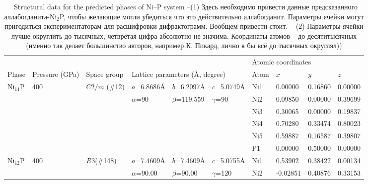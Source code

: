 \documentclass[twoside,twocolumn,9pt]{article}
\begin{document}
\begin{table}[t]
\small
  \caption{\ Structural data for the predicted phases of Ni--P system 
{\color{red}–(1) Здесь необходимо привести данные предсказанного аллабогданита-Ni$_2$P, чтобы желающие могли убедиться что это действительно аллабогданит. Параметры ячейки могут пригодиться экспериментаторам для расшифровки дифрактограмм. Вообщем привести стоит.
– (2) Параметры ячейки лучше округлить до тысячных, четврётая цифра абсолютно не значима. Координаты атомов – до десятитысячных (именно так делает большинство авторов, например К. Пикард, лично я бы всё до тысячных округлял))} }
  \label{tbl:new_phases}
  \begin{tabular*}{\textwidth}{@{\extracolsep{\fill}}llllllllll}
    \hline
    \multicolumn{6}{l}{} & \multicolumn{4}{l}{Atomic coordinates}\\\cline{7-10}
    Phase & Pressure (GPa) & Space group & \multicolumn{3}{l}{Lattice parameters (\AA, degree)}  & Atom & $x$ & $y$ & $z$\\
    \midrule
    Ni$_{14}$P & 400 & $C2/m$ (\#12) & $a$=6.8686\AA    & $b$=6.2097\AA   & $c$=5.0749\AA    & Ni1 & 0.00000 & 0.16860 & 0.00000 \\
               &     &               & $\alpha$=90      & $\beta$=119.559 & $\gamma$=90      & Ni2 & 0.09850 & 0.00000 & 0.39699 \\    
               &     &               &                  &                 &                  & Ni3 & 0.30065 & 0.00000 & 0.19837 \\
               &     &               &                  &                 &                  & Ni4 & 0.70280 & 0.33474 & 0.80023 \\
               &     &               &                  &                 &                  & Ni5 & 0.59887 & 0.16587 & 0.39807 \\
               &     &               &                  &                 &                  & P1  & 0.00000 & 0.50000 & 0.00000 \\
\midrule
    Ni$_{12}$P & 400 & $R\bar3$(\#148)    & $a$=7.4609\AA    & $b$=7.4609\AA   & $c$=5.0755\AA    & Ni1 & 0.53902  & 0.38422 & 0.00134 \\
               &     &               & $\alpha$=90.00   & $\beta$=90.00 & $\gamma$=120       & Ni2 & -0.02851 & 0.40876 & 0.33153 \\

\end{tabular*}
\end{table}
\end{document}
